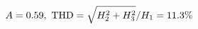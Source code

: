 \documentclass[preview]{standalone}
\begin{document}
\begin{align*}
\special{dvisvgm:raw <g id='unique000'>}A=0.59,\ \text{THD}=\sqrt{H_2^2+H_3^2}/H_1=11.3\%\special{dvisvgm:raw </g>}
\end{align*}
\end{document}
